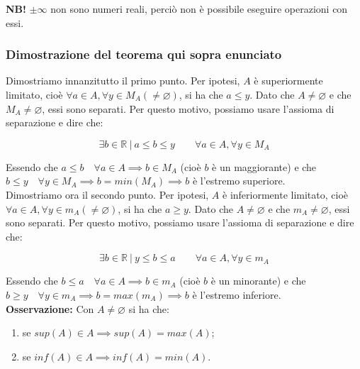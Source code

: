 \documentclass{article}
\begin{document}
\noindent\textbf{NB!} $\pm \infty$ non sono numeri reali, perciò non è possibile eseguire operazioni con essi.

\subsubsection{Dimostrazione del teorema qui sopra enunciato}
Dimostriamo innanzitutto il primo punto. Per ipotesi, $A$ è superiormente limitato, cioè $\forall a \in A, \forall y \in M_A (\neq \varnothing)$, si ha che $a \leq y$. Dato che $A \neq \varnothing$ e che $M_A \neq \varnothing$, essi sono separati. Per questo motivo, possiamo usare l'assioma di separazione e dire che:

\begin{equation*}
    \exists b \in \mathbb{R} \ | \ a \leq b \leq y \qquad \forall a \in A, \forall y \in M_A    
\end{equation*}

\noindent Essendo che $a \leq b \quad \forall a \in A \implies b \in M_A$ (cioè $b$ è un maggiorante) e che $b \leq y \quad \forall y \in M_A \implies b = min(M_A) \implies b$ è l'estremo superiore. \\

\noindent Dimostriamo ora il secondo punto. Per ipotesi, $A$ è inferiormente limitato, cioè $\forall a \in A, \forall y \in m_A (\neq \varnothing)$, si ha che $a \geq y$. Dato che $A \neq \varnothing$ e che $m_A \neq \varnothing$, essi sono separati. Per questo motivo, possiamo usare l'assioma di separazione e dire che: 

\begin{equation*}
    \exists b \in \mathbb{R} \ | \ y \leq b \leq a \qquad \forall a \in A, \forall y \in m_A
\end{equation*}

\noindent Essendo che $b \leq a \quad \forall a \in A \implies b \in m_A$ (cioè $b$ è un minorante) e che $b \geq y \quad \forall y \in m_A \implies b = max(m_A) \implies b$ è l'estremo inferiore. \\

\noindent\textbf{Osservazione:} Con $A \neq \varnothing$ si ha che:

\begin{enumerate}[label=\alph{enumi})]
    \item se $sup(A) \in A \implies sup(A) = max(A)$;
    \item se $inf(A) \in A \implies inf(A) = min(A)$.
\end{enumerate}
\end{document}
